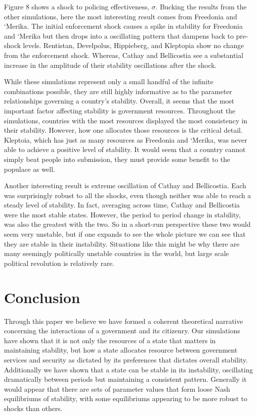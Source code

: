 \documentclass[12pt]{article}
\begin{document}
\begin{spacing}{1.5}
Figure 8 shows a shock to policing effectiveness, $\sigma$. Bucking the results from the other simulations, here the most interesting result comes from Freedonia and `Merika. The initial enforcement shock causes a spike in stability for Freedonia and `Merika but then drops into a oscillating pattern that dampens back to pre-shock levels. Rentistan, Develpolus, Hippieberg, and Kleptopia show no change from the enforcement shock. Whereas, Cathay and Bellicostia see a substantial increase in the amplitude of their stability oscillations after the shock.  


While these simulations represent only a small handful of the infinite combinations possible, they are still highly informative as to the parameter relationships governing a country's stability. Overall, it seems that the most important factor affecting stability is government resources. Throughout the simulations, countries with the most resources displayed the most consistency in their stability. However, how one allocates those resources is the critical detail. Kleptoia, which has just as many resources as Freedonia and `Merika, was never able to achieve a positive level of stability. It would seem that a country cannot simply beat people into submission, they must provide some benefit to the populace as well. 

Another interesting result is extreme oscillation of Cathay and Bellicostia. Each was surprisingly robust to all the shocks, even though neither was able to reach a steady level of stability. In fact, averaging across time, Cathay and Bellicostia were the most stable states. However, the period to period change in stability, was also the greatest with the two. So in a short-run perspective these two would seem very unstable, but if one expands to see the whole picture we can see that they are stable in their instability. Situations like this might be why there are many seemingly politically unstable countries in the world, but large scale political revolution is relatively rare.   

\section{Conclusion}

Through this paper we believe we have formed a coherent theoretical narrative concerning the interactions of a government and its citizenry. Our simulations have shown that it is not only the resources of a state that matters in maintaining stability, but how a state allocates resource between government services and security as dictated by its preferences that dictates overall stability. Additionally we have shown that a state can be stable in its instability, oscillating dramatically between periods but maintaining a consistent pattern. Generally it would appear that there are sets of parameter values that form loose Nash equilibriums of stability, with some equilibriums appearing to be more robust to shocks than others.  


\end{spacing}
\end{document}
